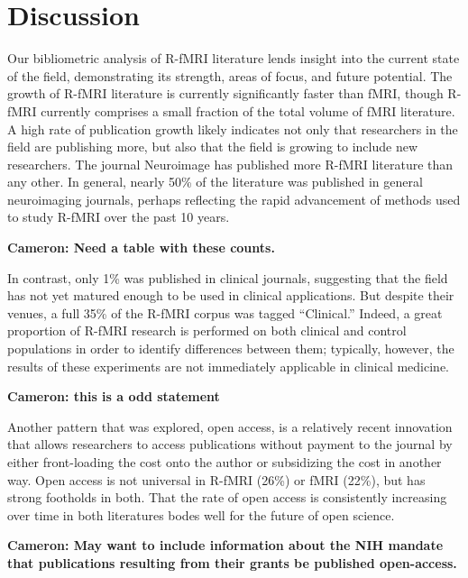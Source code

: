 \documentclass[5p]{elsarticle}
\newcommand\MyCBox[1]{%
  \colorbox{yellow!60}{\begin{varwidth}{\dimexpr\linewidth-2\fboxsep}#1\end{varwidth}}}
\newcommand{\COMMENTCC}[1]{\MyCBox{\textcolor{cc_commentcolor}{\textbf{Cameron:
#1}}}}
\begin{document}
\section{Discussion}

Our bibliometric analysis of R-fMRI literature lends insight into the
current state of the field, demonstrating its strength, areas of focus,
and future potential. The growth of R-fMRI literature is currently
significantly faster than fMRI, though R-fMRI currently comprises a small
fraction of the total volume of fMRI literature. A high rate of
publication growth likely indicates not only that researchers in the field
are publishing more, but also that the field is growing to include new
researchers.  The journal Neuroimage has published more R-fMRI literature
than any other. In general, nearly 50\% of the literature was published in
general neuroimaging journals, perhaps reflecting the rapid advancement of
methods used to study R-fMRI over the past 10 years. 

\COMMENTCC{Need a table with these counts.}

In contrast, only 1\% was published in clinical journals, suggesting that
the field has not yet matured enough to be used in clinical applications.
But despite their venues, a full 35\% of the R-fMRI corpus was tagged
“Clinical.” Indeed, a great proportion of R-fMRI research is performed on
both clinical and control populations in order to identify differences
between them; typically, however, the results of these experiments are not
immediately applicable in clinical medicine. \COMMENTCC{this is a odd
statement}

Another pattern that was explored, open access, is a relatively recent
innovation that allows researchers to access publications without payment
to the journal by either front-loading the cost onto the author or
subsidizing the cost in another way. Open access is not universal in
R-fMRI (26\%) or fMRI (22\%), but has strong footholds in both. That the
rate of open access is consistently increasing over time in both
literatures bodes well for the future of open science. \COMMENTCC{May want
to include information about the NIH mandate that publications resulting
from their grants be published open-access.}
\end{document}
